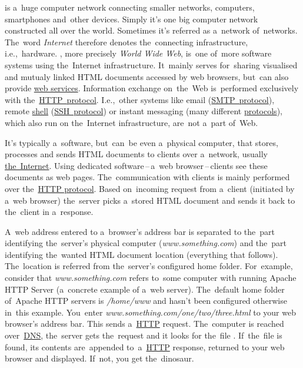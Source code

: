 \label{internetweb}
\begin{itemize}
     is a~huge computer network connecting smaller networks, computers, smartphones and~other devices.
            Simply it's one big computer network constructed all over the world.
            Sometimes it's referred as a~network of~networks.
            The~word \textit{Internet} therefore denotes the~connecting infrastructure, i.e.,~hardware.
    , more precisely \textit{World Wide Web}, is~one of~more software systems using the~Internet infrastructure.
            It~mainly serves for~sharing visualised and mutualy linked HTML documents accessed by web browsers, but~can also provide \hyperref[webserviceapplication]{web services}.
            Information exchange on~the~Web is~performed exclusively with the~\hyperref[http]{HTTP~protocol}.
            I.e.,~other systems like email (\hyperref[smtp]{SMTP~protocol}), remote \hyperref[shellcligui]{shell} (\hyperref[ssh]{SSH~protocol}) or instant messaging (many different \hyperref[protocolstandard]{protocols}), which also run on the~Internet infrastructure, are~not a~part of~Web.
\end{itemize}

\label{namespaces}

\label{webserver}
It's typically a~software, but~can~be even a~physical computer, that stores, processes and sends HTML documents to clients over a~network, usually \hyperref[internetweb]{the~Internet}.
Using dedicated software\,--\,a~web browser\,--\,clients see these documents as web pages.
The~communication with clients is mainly performed over the~\hyperref[http]{HTTP protocol}.
Based on~incoming request from a~client (initiated by a~web browser) the~server picks a~stored HTML document and sends it back to the~client in a~response.

A~web address entered to a~browser's address bar is separated to the~part identifying the~server's physical computer (\textit{www.something.com}) and the~part identifying the~wanted HTML document location (everything that follows).
The~location is referred from the~server's configured home folder.
For~example, consider that \textit{www.something.com} refers to~some computer with running Apache HTTP Server (a~concrete example of a~web server).
The~default home folder of~Apache HTTP servers is \textit{/home/www} and hasn't been configured otherwise in~this example.
You~enter \textit{www.something.com/one/two/three.html} to your web browser's address bar.
This sends a~\hyperref[http]{HTTP} request.
The~computer is reached over~\hyperref[dns]{DNS}, the~server gets the~request and it looks for the~file .
If~the~file is found, its contents are~appended to~a~\hyperref[http]{HTTP} response, returned to your web browser and displayed.
If~not, you get the~dinosaur.


